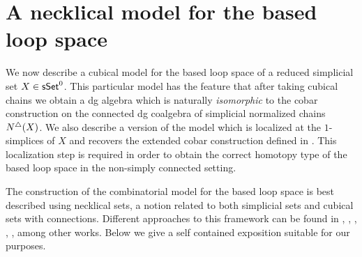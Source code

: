\section{A necklical model for the based loop space}

We now describe a cubical model for the based loop space of a reduced simplicial set $X \in \mathsf{sSet}^0$. This particular model has the feature that after taking cubical chains we obtain a dg algebra which is naturally \textit{isomorphic} to the cobar construction on the connected dg coalgebra of simplicial normalized chains $N^{\triangle}(X)$. We also describe a version of the model which is localized at the $1$-simplices of $X$ and recovers the extended cobar construction defined in \cite{Hess-Tonks}. This localization step is required in order to obtain the correct homotopy type of the based loop space in the non-simply connected setting.

The construction of the combinatorial model for the based loop space is best described using necklical sets, a notion related to both simplicial sets and cubical sets with connections. Different approaches to this framework can be found in \cite{Baues}, \cite{Galvez-Kaufmann-Tonks}, \cite{Dugger-Spivak}, \cite{rivera-zeinalian-cubical}, \cite{Rivera-Saneblidze}, among other works. Below we give a self contained exposition suitable for our purposes. 



